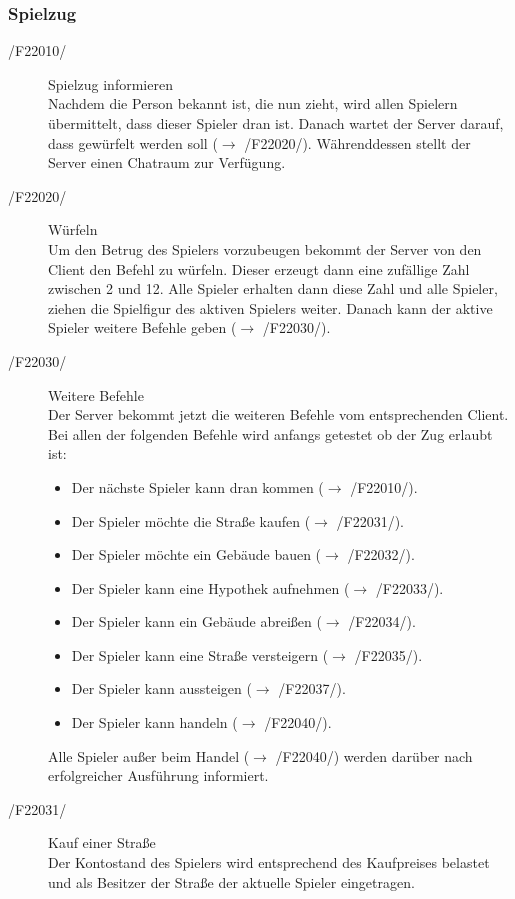 \documentclass[a4paper,10pt]{article}
\begin{document}
\subsubsection{Spielzug}
\begin{description}
\item[/F22010/] Spielzug informieren \\
Nachdem die Person bekannt ist, die nun zieht, wird allen Spielern übermittelt, dass dieser Spieler dran ist. Danach wartet der Server darauf, dass gewürfelt werden soll ($\rightarrow$ /F22020/). Währenddessen stellt der Server einen Chatraum zur Verfügung.
\item[/F22020/] Würfeln \\
Um den Betrug des Spielers vorzubeugen bekommt der Server von den Client den Befehl zu würfeln. Dieser erzeugt dann eine zufällige Zahl zwischen 2 und 12. Alle Spieler erhalten dann diese Zahl und alle Spieler, ziehen die Spielfigur des aktiven Spielers weiter. Danach kann der aktive Spieler weitere Befehle geben ($\rightarrow$ /F22030/).
\item[/F22030/] Weitere Befehle \\
Der Server bekommt jetzt die weiteren Befehle vom entsprechenden Client. Bei allen der folgenden Befehle wird anfangs getestet ob der Zug erlaubt ist:
\begin{itemize}
\item Der nächste Spieler kann dran kommen ($\rightarrow$ /F22010/).
\item Der Spieler möchte die Straße kaufen ($\rightarrow$ /F22031/).
\item Der Spieler möchte ein Gebäude bauen ($\rightarrow$ /F22032/).
\item Der Spieler kann eine Hypothek aufnehmen ($\rightarrow$ /F22033/).
\item Der Spieler kann ein Gebäude abreißen ($\rightarrow$ /F22034/).
\item Der Spieler kann eine Straße versteigern ($\rightarrow$ /F22035/).
\item Der Spieler kann aussteigen ($\rightarrow$ /F22037/).
\item Der Spieler kann handeln ($\rightarrow$ /F22040/).
\end{itemize}
Alle Spieler außer beim Handel ($\rightarrow$ /F22040/) werden darüber nach erfolgreicher Ausführung informiert.
\item[/F22031/] Kauf einer Straße \\
Der Kontostand des Spielers wird entsprechend des Kaufpreises belastet und als Besitzer der Straße der aktuelle Spieler eingetragen.

\end{description}
\end{document}
